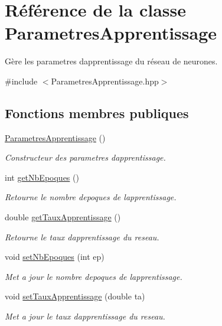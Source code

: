 \hypertarget{classParametresApprentissage}{}\section{Référence de la classe Parametres\+Apprentissage}
\label{classParametresApprentissage}


Gère les parametres d\textquotesingle{}apprentissage du réseau de neurones.  




{\ttfamily \#include $<$Parametres\+Apprentissage.\+hpp$>$}

\subsection*{Fonctions membres publiques}
\begin{DoxyCompactItemize}
\item 
\mbox{\label{classParametresApprentissage_a0912bbe1ac8b0f2e0248edf049ef0b53}} 
\hyperlink{classParametresApprentissage_a0912bbe1ac8b0f2e0248edf049ef0b53}{Parametres\+Apprentissage} ()
\begin{DoxyCompactList}\small\item\em Constructeur des parametres d\textquotesingle{}apprentissage. \end{DoxyCompactList}\item 
int \hyperlink{classParametresApprentissage_ad4342b1543901201ad28b1da5c11dc26}{get\+Nb\+Epoques} ()
\begin{DoxyCompactList}\small\item\em Retourne le nombre d\textquotesingle{}epoques de l\textquotesingle{}apprentissage. \end{DoxyCompactList}\item 
double \hyperlink{classParametresApprentissage_aa5b6d225498ee1270996ace135745fdd}{get\+Taux\+Apprentissage} ()
\begin{DoxyCompactList}\small\item\em Retourne le taux d\textquotesingle{}apprentissage du reseau. \end{DoxyCompactList}\item 
void \hyperlink{classParametresApprentissage_a0b424fc552461e9e13d51024bd071470}{set\+Nb\+Epoques} (int ep)
\begin{DoxyCompactList}\small\item\em Met a jour le nombre d\textquotesingle{}epoques de l\textquotesingle{}apprentissage. \end{DoxyCompactList}\item 
void \hyperlink{classParametresApprentissage_a13b6b90a24b4733c6b465aa74a1abda9}{set\+Taux\+Apprentissage} (double ta)
\begin{DoxyCompactList}\small\item\em Met a jour le taux d\textquotesingle{}apprentissage du reseau. \end{DoxyCompactList}\end{DoxyCompactItemize}


